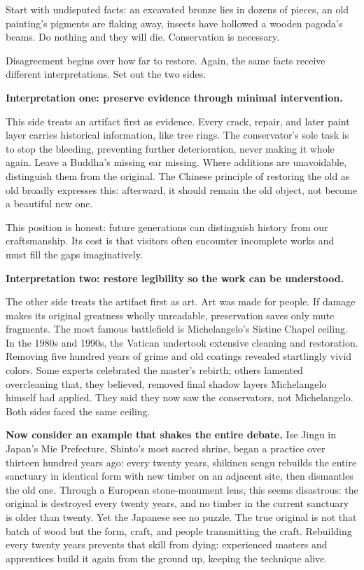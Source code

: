Start with undisputed facts: an excavated bronze lies in dozens of pieces, an old painting's pigments are flaking away, insects have hollowed a wooden pagoda's beams. Do nothing and they will die. Conservation is necessary.

Disagreement begins over how far to restore. Again, the same facts receive different interpretations. Set out the two sides.

\textbf{Interpretation one: preserve evidence through minimal intervention.}

This side treats an artifact first as evidence. Every crack, repair, and later paint layer carries historical information, like tree rings. The conservator's sole task is to stop the bleeding, preventing further deterioration, never making it whole again. Leave a Buddha's missing ear missing. Where additions are unavoidable, distinguish them from the original. The Chinese principle of restoring the old as old broadly expresses this: afterward, it should remain the old object, not become a beautiful new one.

This position is honest: future generations can distinguish history from our craftsmanship. Its cost is that visitors often encounter incomplete works and must fill the gaps imaginatively.

\textbf{Interpretation two: restore legibility so the work can be understood.}

The other side treats the artifact first as art. Art was made for people. If damage makes its original greatness wholly unreadable, preservation saves only mute fragments. The most famous battlefield is Michelangelo's Sistine Chapel ceiling. In the 1980s and 1990s, the Vatican undertook extensive cleaning and restoration. Removing five hundred years of grime and old coatings revealed startlingly vivid colors. Some experts celebrated the master's rebirth; others lamented overcleaning that, they believed, removed final shadow layers Michelangelo himself had applied. They said they now saw the conservators, not Michelangelo. Both sides faced the same ceiling.

\textbf{Now consider an example that shakes the entire debate.} Ise Jingu in Japan's Mie Prefecture, Shinto's most sacred shrine, began a practice over thirteen hundred years ago: every twenty years, shikinen sengu rebuilds the entire sanctuary in identical form with new timber on an adjacent site, then dismantles the old one. Through a European stone-monument lens, this seems disastrous: the original is destroyed every twenty years, and no timber in the current sanctuary is older than twenty. Yet the Japanese see no puzzle. The true original is not that batch of wood but the form, craft, and people transmitting the craft. Rebuilding every twenty years prevents that skill from dying: experienced masters and apprentices build it again from the ground up, keeping the technique alive.


